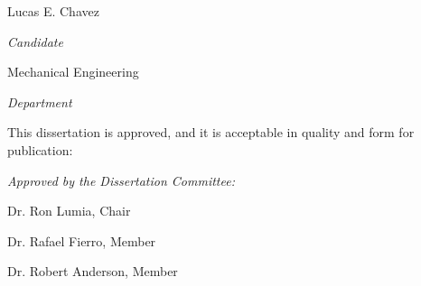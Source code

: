 \documentclass[letterpaper,10pt]{article}
\begin{document}
\vspace{0.8in}
\begin{Large}
 \noindent Lucas E. Chavez
 \end{Large}

 \noindent\makebox[\linewidth][l]{\rule{3.9in}{1pt}}
  \textit{Candidate} \vspace{0.5in}

 \begin{Large}
 \noindent Mechanical Engineering 
 \end{Large}

  \noindent\makebox[\linewidth][l]{\rule{3.9in}{1pt}}
    \textit{Department} \vspace{0.4in}




   \noindent This dissertation is approved, and it is acceptable in quality and form for publication: \vspace{0.2in}
\begin{large}
 \noindent \textit{Approved by the Dissertation Committee:} \vspace{1in}
 \end{large}

%
%
%



 \noindent\makebox[\linewidth]{\rule{5.5in}{1pt}}

 Dr. Ron Lumia, Chair \vfill



 \noindent\makebox[\linewidth]{\rule{5.5in}{1pt}}

 Dr. Rafael Fierro, Member  \vfill



   \noindent\makebox[\linewidth]{\rule{5.5in}{1pt}}

 Dr. Robert Anderson, Member  \vfill
\end{document}
